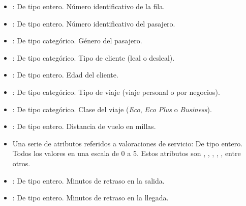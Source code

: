 \begin{itemize}

    \item {}: De tipo entero. Número identificativo de la fila.

    \item {}: De tipo entero. Número identificativo del pasajero.

    \item {}: De tipo categórico. Género del pasajero. 

    \item {}: De tipo categórico. Tipo de cliente (leal o desleal).

    \item {}: De tipo entero. Edad del cliente.

    \item {}: De tipo categórico. Tipo de viaje (viaje personal o por negocios).

    \item {}: De tipo categórico. Clase del viaje (\textit{Eco}, \textit{Eco Plus} o \textit{Business}).

    \item {}: De tipo entero. Distancia de vuelo en millas.

    \item Una serie de atributos referidos a valoraciones de servicio: De tipo entero. Todos los valores en una escala de 0 a 5. Estos atributos son , , , , , entre otros.

    \item {}: De tipo entero. Minutos de retraso en la salida.

    \item {}: De tipo entero. Minutos de retraso en la llegada.
    
\end{itemize}


